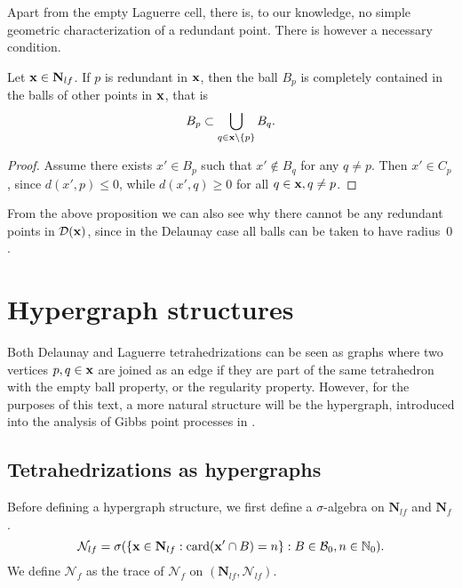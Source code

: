 Apart from the empty Laguerre cell, there is, to our knowledge, no simple geometric characterization of a redundant point. There is however a necessary condition.

\begin{proposition}
	Let ${\mathbf{x}} \in \mathbf N_{lf}$. If $p$ is redundant in ${\mathbf{x}}$, then the ball $B_p$ is completely contained in the balls of other points in ${\mathbf{x}}$, that is 
	$$B_p \subset \bigcup_{q \in {\mathbf{x}}\setminus \{p\}} B_q.$$
\end{proposition}
\begin{proof}
	Assume there exists $x' \in B_p$ such that $x' \notin B_q$ for any $q\neq p$. Then $x' \in C_p$, since $d(x', p) \leq 0$, while $d(x',q) \geq 0$ for all $q\in {\mathbf{x}}, q\neq p$.
\end{proof}



From the above proposition we can also see why there cannot be any redundant points in $\mathcal D({\mathbf{x}})$, since in the Delaunay case all balls can be taken to have radius~$0$.


\section{Hypergraph structures}\label{sec:hypergraphs}
Both Delaunay and Laguerre tetrahedrizations can be seen as graphs where two vertices $p,q\in{\mathbf{x}}$ are joined as an edge if they are part of the same tetrahedron with the empty ball property, or the regularity property. However, for the purposes of this text, a more natural structure will be the hypergraph, introduced into the analysis of Gibbs point processes in \cite{DDG12}.

\subsection{Tetrahedrizations as hypergraphs}\label{sec:tetrahyper}
Before defining a hypergraph structure, we first define a $\sigma$-algebra on $\mathbf N_{lf}$ and $\mathbf N_{f}$. 
$$\mathcal N_{lf}=\sigma(\{{\mathbf{x}} \in \mathbf N_{lf}: \mathrm{card}({\mathbf{x}}'\cap B)=n\}: B \in \mathcal B_0, n\in \mathbb N_0).$$
We define $\mathcal N_{f}$ as the trace of $\mathcal N_f$ on $(\mathbf N_{lf}, \mathcal N_{lf})$.
 
